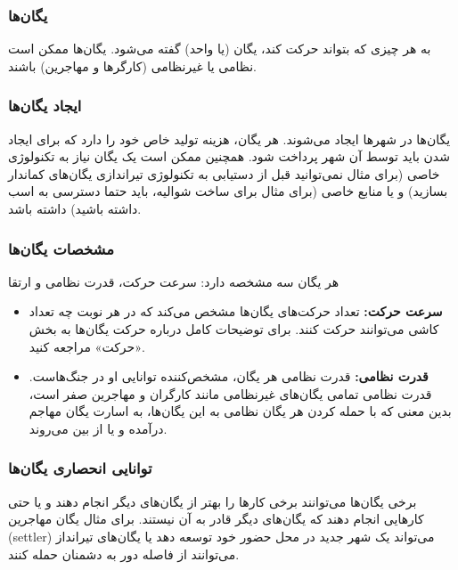 \documentclass[]{article}
\begin{document}
\subsubsection*{{\titr یگان‌ها}}
به هر چیزی که بتواند حرکت کند، یگان (یا واحد) گفته می‌شود. یگان‌ها ممکن است نظامی یا غیرنظامی (کارگرها و مهاجرین) باشند.

\subsubsection*{{\titr ایجاد یگان‌ها}}
یگان‌ها در شهرها ایجاد می‌شوند. هر یگان، هزینه تولید خاص خود را دارد که برای ایجاد شدن باید توسط آن شهر پرداخت شود. همچنین ممکن است یک یگان نیاز به تکنولوژی خاصی (برای مثال نمی‌توانید قبل از دستیابی به تکنولوژی تیراندازی یگان‌های کماندار بسازید) و یا منابع خاصی (برای مثال برای ساخت شوالیه، باید حتما دسترسی به اسب داشته باشید) داشته باشد.

\subsubsection*{{\titr مشخصات یگان‌ها}}
هر یگان سه مشخصه دارد: سرعت حرکت، قدرت نظامی و ارتقا
\begin{itemize}
\item \noindent \textbf{سرعت حرکت:}
تعداد حرکت‌های یگان‌ها مشخص می‌کند که در هر نوبت چه تعداد کاشی می‌توانند حرکت کنند. برای توضیحات کامل درباره حرکت یگان‌ها به بخش «حرکت» مراجعه کنید.
\item \noindent \textbf{قدرت نظامی:}
قدرت نظامی هر یگان، مشخص‌کننده توانایی او در جنگ‌هاست. قدرت نظامی تمامی یگان‌های غیرنظامی مانند کارگران و مهاجرین صفر است، بدین معنی که با حمله کردن هر یگان نظامی به این یگان‌ها، به اسارت یگان مهاجم درآمده و یا از بین می‌روند.

\end{itemize}


\subsubsection*{{\titr توانایی انحصاری یگان‌ها}}
برخی یگان‌ها می‌توانند برخی کارها را بهتر از یگان‌های دیگر انجام دهند و یا حتی کارهایی انجام دهند که یگان‌های دیگر قادر به آن نیستند. برای مثال یگان مهاجرین (settler) می‌تواند یک شهر جدید در محل حضور خود توسعه دهد یا یگان‌های تیرانداز می‌توانند از فاصله دور به دشمنان حمله کنند.
\end{document}
